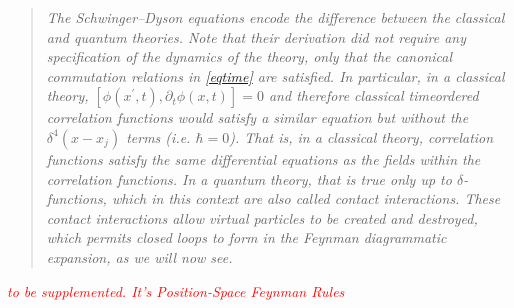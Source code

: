 \documentclass[12pt,openany]{book}
\begin{document}
	\begin{quotation}
		\textit{
		The Schwinger–Dyson equations encode the difference between the classical and quantum theories.
		 Note that their derivation did not require any specification of the dynamics of the theory, 
		 only that the canonical commutation relations in \eqref{eqtime} are satisfied.
		 In particular, in a classical theory, $[\phi(x^\prime,t),\partial_t\phi(x,t)] = 0$ and therefore classical timeordered correlation functions would satisfy a similar equation but without the $\delta^4(x-x_j)$ terms (i.e. $\hbar=0$).
		  That is, in a classical theory, correlation functions satisfy the same differential equations as the fields within the correlation functions. 
		  In a quantum theory, that is true only up to $\delta$-functions, 
		  which in this context are also called contact interactions.
		   These contact interactions allow virtual particles to be created and destroyed, 
		   which permits closed loops to form in the Feynman diagrammatic expansion, as we will now see.
		}
	\end{quotation}
	\begin{center}
		\textcolor{red}{\textit{to be supplemented. It's Position-Space Feynman Rules}}
	\end{center}
	
	
	
	
	
	
	
	
	
	
	
	
	
	
	
	
	
	
	
	
	
	
	
	
	
	
	
	
	
	
	
	
	
	
	
\end{document}
